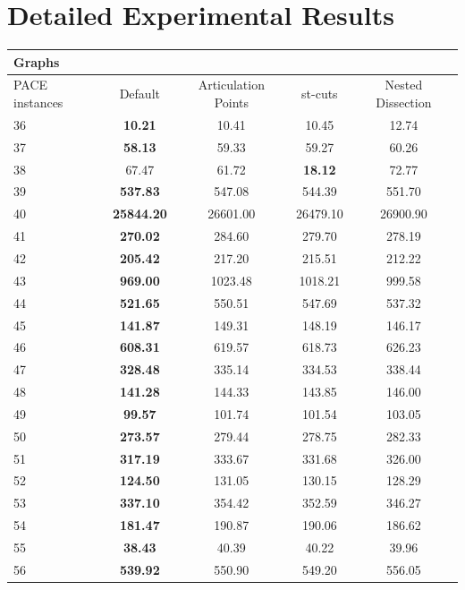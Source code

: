 \documentclass[a4paper,UKenglish,cleveref, autoref, thm-restate]{lipics-v2021}
\begin{document}
\section{Detailed Experimental Results}
\label{app:detailed_results}
\begin{table}
	\begin{center}
		\begin{tabular}{|l|c|c|c|c|}
			\multicolumn{5}{|l|}{Graphs}\\
			\hline
			PACE instances & Default & Articulation Points & st-cuts & Nested Dissection \\
			\hline
			36 & \textbf{10.21} & 10.41 & 10.45 & 12.74 \\
			37 & \textbf{58.13} & 59.33 & 59.27 & 60.26 \\
			38 & 67.47 & 61.72 & \textbf{18.12} & 72.77 \\
			39 & \textbf{537.83} & 547.08 & 544.39 & 551.70 \\
			40 & \textbf{25844.20} & 26601.00 & 26479.10 & 26900.90 \\
			41 & \textbf{270.02} & 284.60 & 279.70 & 278.19 \\
			42 & \textbf{205.42} & 217.20 & 215.51 & 212.22 \\
			43 & \textbf{969.00} & 1023.48 & 1018.21 & 999.58 \\
			44 & \textbf{521.65} & 550.51 & 547.69 & 537.32 \\
			45 & \textbf{141.87} & 149.31 & 148.19 & 146.17 \\
			46 & \textbf{608.31} & 619.57 & 618.73 & 626.23 \\
			47 & \textbf{328.48} & 335.14 & 334.53 & 338.44 \\
			48 & \textbf{141.28} & 144.33 & 143.85 & 146.00 \\
			49 & \textbf{99.57} & 101.74 & 101.54 & 103.05 \\
			50 & \textbf{273.57} & 279.44 & 278.75 & 282.33 \\
			51 & \textbf{317.19} & 333.67 & 331.68 & 326.00 \\
			52 & \textbf{124.50} & 131.05 & 130.15 & 128.29 \\
			53 & \textbf{337.10} & 354.42 & 352.59 & 346.27 \\
			54 & \textbf{181.47} & 190.87 & 190.06 & 186.62 \\
			55 & \textbf{38.43} & 40.39 & 40.22 & 39.96 \\
			56 & \textbf{539.92} & 550.90 & 549.20 & 556.05 \\

\end{tabular}
\end{center}
\end{table}
\end{document}
